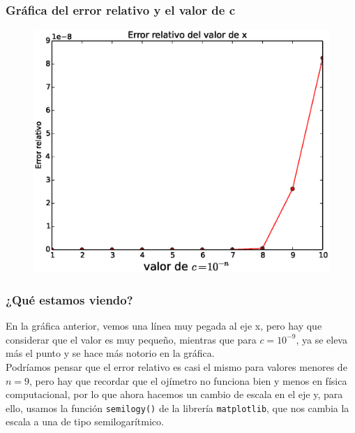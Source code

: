 \begin{frame}[fragile]
\frametitle{Gráfica del error relativo y el valor de c}
\begin{figure}
	\centering
	\includegraphics[scale=0.45]{Imagenes/Ejercicio_Eq_Cuadratica_01.eps} 
\end{figure}
\end{frame}
\begin{frame}
\frametitle{¿Qué estamos viendo?}
En la gráfica anterior, vemos una línea muy pegada al eje x, pero hay que considerar que el valor es muy pequeño, mientras que para $c=10^{-9}$, ya se eleva más el punto y se hace más notorio en la gráfica.
\\
\medskip
Podríamos pensar que el error relativo es casi el mismo para valores menores de $n=9$, pero hay que recordar que el ojímetro no funciona bien y menos en física computacional, por lo que ahora hacemos un cambio de escala en el eje y, para ello, usamos la función \texttt{semilogy()} de la librería \texttt{matplotlib}, que nos cambia la escala a una de tipo semilogarítmico.
\end{frame}
